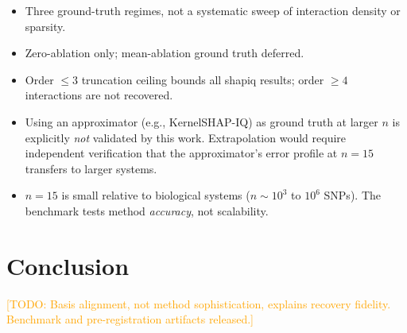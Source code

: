 \documentclass[11pt]{article}
\newcommand{\todo}[1]{\textcolor{orange}{[TODO: #1]}}
\begin{document}
\begin{itemize}
\item Three ground-truth regimes, not a systematic sweep of interaction
      density or sparsity.
\item Zero-ablation only; mean-ablation ground truth deferred.
\item Order $\leq 3$ truncation ceiling bounds all shapiq results;
      order $\geq 4$ interactions are not recovered.
\item Using an approximator (e.g., KernelSHAP-IQ) as ground truth at
      larger $n$ is explicitly \emph{not} validated by this work.
      Extrapolation would require independent verification that the
      approximator's error profile at $n = 15$ transfers to larger
      systems.
\item $n = 15$ is small relative to biological systems ($n \sim 10^3$
      to $10^6$ SNPs). The benchmark tests method \emph{accuracy},
      not scalability.
\end{itemize}


\section{Conclusion}
\label{sec:conclusion}

\todo{Basis alignment, not method sophistication, explains recovery
fidelity. Benchmark and pre-registration artifacts released.}




% 
\end{document}
